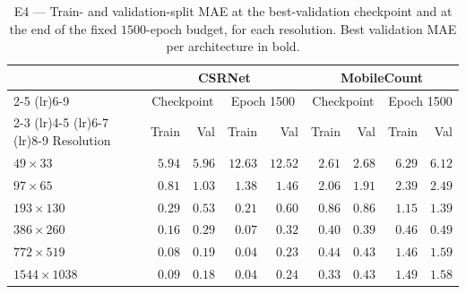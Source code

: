 \documentclass[conference]{IEEEtran}
\begin{document}
\begin{table}[t]
    \centering
    \caption{E4 --- Train- and validation-split MAE at the best-validation
    checkpoint and at the end of the fixed $1500$-epoch budget, for each
    resolution. Best validation MAE per architecture in bold.}
    \label{tab:e4_budget}
    \small
    \setlength{\tabcolsep}{4pt}
    \begin{tabular}{@{}l rr rr rr rr@{}}
        \toprule
        & \multicolumn{4}{c}{CSRNet} & \multicolumn{4}{c}{MobileCount} \\
        \cmidrule(lr){2-5} \cmidrule(lr){6-9}
        & \multicolumn{2}{c}{Checkpoint} & \multicolumn{2}{c}{Epoch 1500}
        & \multicolumn{2}{c}{Checkpoint} & \multicolumn{2}{c}{Epoch 1500} \\
        \cmidrule(lr){2-3} \cmidrule(lr){4-5} \cmidrule(lr){6-7} \cmidrule(lr){8-9}
        Resolution & Train & Val & Train & Val & Train & Val & Train & Val \\
        \midrule
        $49\times33$      & $5.94$ & $5.96$ & $12.63$ & $12.52$ & $2.61$ & $2.68$ & $6.29$ & $6.12$ \\
        $97\times65$      & $0.81$ & $1.03$ & $1.38$  & $1.46$  & $2.06$ & $1.91$ & $2.39$ & $2.49$ \\
        $193\times130$    & $0.29$ & $0.53$ & $0.21$  & $0.60$  & $0.86$ & $0.86$ & $1.15$ & $1.39$ \\
        $386\times260$    & $0.16$ & $0.29$ & $0.07$  & $0.32$  & $0.40$ & $\mathbf{0.39}$ & $0.46$ & $0.49$ \\
        $772\times519$    & $0.08$ & $0.19$ & $0.04$  & $0.23$  & $0.44$ & $0.43$ & $1.46$ & $1.59$ \\
        $1544\times1038$  & $0.09$ & $\mathbf{0.18}$ & $0.04$ & $0.24$ & $0.33$ & $0.43$ & $1.49$ & $1.58$ \\
        \bottomrule
    \end{tabular}
\end{table}

\clearpage
\twocolumn



\end{document}

